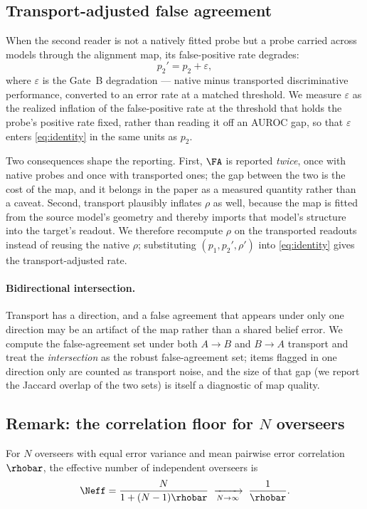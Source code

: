 \subsection{Transport-adjusted false agreement}
\label{sec:theory:transport}

When the second reader is not a natively fitted probe but a probe carried across
models through the alignment map, its false-positive rate degrades:
\[
  p_2' = p_2 + \varepsilon ,
\]
where $\varepsilon$ is the Gate~B degradation --- native minus transported discriminative
performance, converted to an error rate at a matched threshold. We measure $\varepsilon$
as the realized inflation of the false-positive rate at the threshold that holds
the probe's positive rate fixed, rather than reading it off an AUROC gap, so that
$\varepsilon$ enters \eqref{eq:identity} in the same units as $p_2$.

Two consequences shape the reporting. First, $\FA$ is reported \emph{twice}, once
with native probes and once with transported ones; the gap between the two is the
cost of the map, and it belongs in the paper as a measured quantity rather than a
caveat. Second, transport plausibly inflates $\rho$ as well, because the map is
fitted from the source model's geometry and thereby imports that model's
structure into the target's readout. We therefore recompute $\rho$ on the
transported readouts instead of reusing the native $\rho$; substituting
$(p_1, p_2', \rho')$ into \eqref{eq:identity} gives the transport-adjusted rate.

\paragraph{Bidirectional intersection.}
Transport has a direction, and a false agreement that appears under only one
direction may be an artifact of the map rather than a shared belief error. We
compute the false-agreement set under both $A \to B$ and $B \to A$ transport and
treat the \emph{intersection} as the robust false-agreement set; items flagged in
one direction only are counted as transport noise, and the size of that gap (we
report the Jaccard overlap of the two sets) is itself a diagnostic of map
quality.

\subsection{Remark: the correlation floor for $N$ overseers}
\label{sec:theory:neff}

\begin{remark}
\label{rem:neff}
For $N$ overseers with equal error variance and mean pairwise error correlation
$\rhobar$, the effective number of independent overseers is
\begin{equation}
  \Neff = \frac{N}{1 + (N-1)\rhobar}
  \;\xrightarrow[N \to \infty]{}\; \frac{1}{\rhobar}.
  \label{eq:neff}
\end{equation}
\end{remark}

